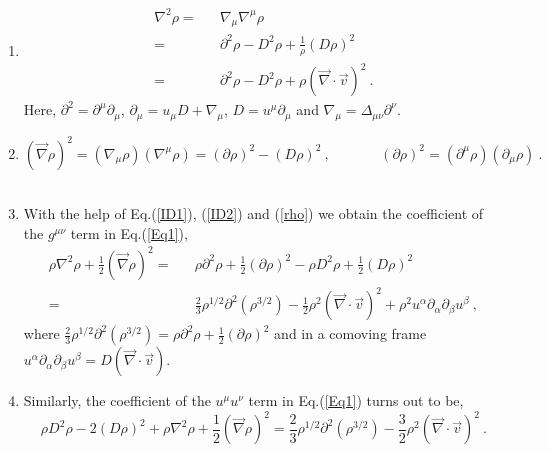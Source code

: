 \documentclass[a4paper,10pt]{article}
\begin{document}
\begin{enumerate}
 
\item 
\begin{eqnarray}
 \nabla^2\rho=&&\nabla_{\mu}\nabla^{\mu}\rho~\nonumber\\
             =&&\partial^2\rho-D^2\rho+\frac{1}{\rho}(D\rho)^2~\nonumber\\
             =&& \partial^2\rho-D^2\rho+\rho(\vec{\nabla}\cdot \vec{v})^2~.
\label{ID1}             
\end{eqnarray}
Here, $\partial^2=\partial^{\mu}\partial_{\mu}$, $\partial_{\mu}=u_{\mu}D+\nabla_{\mu}$, $D=u^{\mu}\partial_{\mu}$ and $\nabla_{\mu}=\Delta_{\mu\nu}\partial^{\nu}$.
\\
\item
\begin{equation}
(\vec{\nabla}\rho)^2=(\nabla_{\mu}\rho)(\nabla^{\mu}\rho)=(\partial \rho)^2-(D\rho)^2~,~~~~~~~~~~~~~~~~(\partial \rho)^2=(\partial^{\mu}\rho)(\partial_{\mu}\rho)~.
\label{ID2}
\end{equation}
\\
\item With the help of Eq.(\ref{ID1}), (\ref{ID2}) and (\ref{rho}) we obtain the coefficient of the $g^{\mu\nu}$ term in Eq.(\ref{Eq1}),
\begin{eqnarray}
 \rho\nabla^2\rho+\frac{1}{2}(\vec{\nabla}\rho)^2=&&\rho\partial^2\rho+\frac{1}{2}(\partial \rho)^2-\rho D^2\rho +\frac{1}{2}(D\rho)^2\nonumber\\
 =&& \frac{2}{3}\rho^{1/2}\partial^2(\rho^{3/2})-\frac{1}{2}\rho^2(\vec{\nabla}\cdot \vec{v})^2+\rho^2 u^{\alpha}\partial_{\alpha}\partial_{\beta}u^{\beta}~,
\end{eqnarray}
where $\frac{2}{3}\rho^{1/2}\partial^2(\rho^{3/2})=\rho\partial^2\rho+\frac{1}{2}(\partial\rho)^2$ and in a comoving frame $u^{\alpha}\partial_{\alpha}\partial_{\beta}u^{\beta}=D(\vec{\nabla}\cdot\vec{v})$.
\\
\item Similarly, the coefficient of the $u^{\mu}u^{\nu}$ term in Eq.(\ref{Eq1}) turns out to be,
\begin{equation}
 \rho D^2\rho-2(D\rho)^2+\rho\nabla^2\rho+\frac{1}{2}(\vec{\nabla}\rho)^2=\frac{2}{3}\rho^{1/2}\partial^2(\rho^{3/2})-\frac{3}{2}\rho^2(\vec{\nabla}\cdot \vec{v})^2~.
\end{equation}

\end{enumerate}
\end{document}
